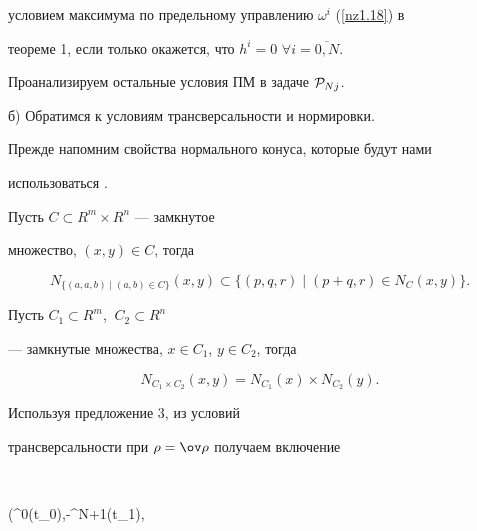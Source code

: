 условием максимума по предельному управлению $\omega^i$ (\ref{nz1.18}) в


теореме 1, если только окажется, что $h^i=0$ $\forall i=\overline{0,N}$.





Проанализируем остальные условия ПМ в задаче ${\cal P}_{Nj}$.


\smallskip





б) Обратимся к условиям трансверсальности и нормировки.





Прежде напомним свойства нормального конуса, которые будут нами


использоваться \cite{K}.





\begin{prop}


Пусть $C\subset R^m\times R^n$ --- замкнутое


множество, $(x,y)\in C$, тогда


$$


N_{\{(a,a,b)\mid (a,b)\in C\}}(x,y)\subset \{(p,q,r)\mid


(p+q,r)\in N_C(x,y)\}.


$$


\end{prop}





\begin{prop}


Пусть $C_1\subset R^m$, $\ C_2\subset R^n$


--- замкнутые множества, $x\in C_1$, $y\in C_2$, тогда


$$


N_{C_1\times C_2}(x,y)=N_{C_1}(x)\times N_{C_2}(y).


$$


\end{prop}





Используя предложение 3,  из условий


трансверсальности при $\rho=\ov \rho$ получаем включение


$$


(\psi^0(t_0),-\psi^{N+1}(t_1),


